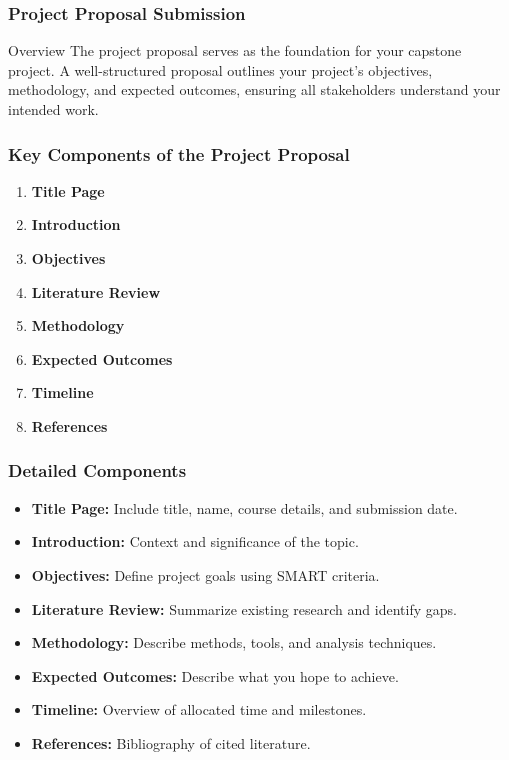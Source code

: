 \documentclass[aspectratio=169]{beamer}
\begin{document}
\begin{frame}[fragile]
    \frametitle{Project Proposal Submission}
    \begin{block}{Overview}
        The project proposal serves as the foundation for your capstone project. A well-structured proposal outlines your project’s objectives, methodology, and expected outcomes, ensuring all stakeholders understand your intended work.
    \end{block}
\end{frame}

\begin{frame}[fragile]
    \frametitle{Key Components of the Project Proposal}
    \begin{enumerate}
        \item \textbf{Title Page}
        \item \textbf{Introduction}
        \item \textbf{Objectives}
        \item \textbf{Literature Review}
        \item \textbf{Methodology}
        \item \textbf{Expected Outcomes}
        \item \textbf{Timeline}
        \item \textbf{References}
    \end{enumerate}
\end{frame}

\begin{frame}[fragile]
    \frametitle{Detailed Components}
    \begin{itemize}
        \item \textbf{Title Page:} Include title, name, course details, and submission date.
        \item \textbf{Introduction:} Context and significance of the topic.
        \item \textbf{Objectives:} Define project goals using SMART criteria.
        \item \textbf{Literature Review:} Summarize existing research and identify gaps.
        \item \textbf{Methodology:} Describe methods, tools, and analysis techniques.
        \item \textbf{Expected Outcomes:} Describe what you hope to achieve.
        \item \textbf{Timeline:} Overview of allocated time and milestones.
        \item \textbf{References:} Bibliography of cited literature.
    \end{itemize}
\end{frame}
\end{document}
